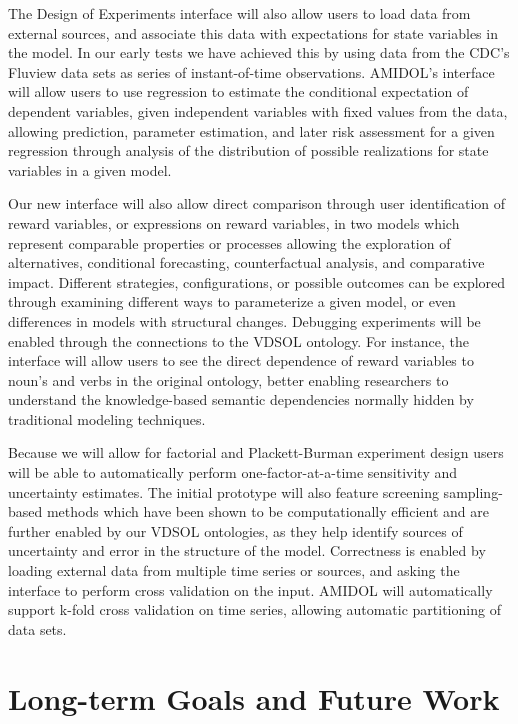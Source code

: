 \documentclass[11pt]{article}
\newcommand{\amidol}{\textsc{AMIDOL}}
\begin{document}
The Design of Experiments interface will also allow users to load data
from external sources, and associate this data with expectations for
state variables in the model.  In our early tests we have achieved
this by using data from the CDC's Fluview \cite{cdc2019fluview} data
sets as series of instant-of-time observations.  \amidol{}'s interface
will allow users to use regression to estimate the conditional
expectation of dependent variables, given independent variables with
fixed values from the data, allowing prediction, parameter estimation,
and later risk assessment for a given regression through analysis of
the distribution of possible realizations for state variables in a
given model.

Our new interface will also allow direct comparison through user
identification of reward variables, or expressions on reward
variables, in two models which represent comparable properties or
processes allowing the exploration of alternatives, conditional
forecasting, counterfactual analysis, and comparative impact.
Different strategies, configurations, or possible outcomes can be
explored through examining different ways to parameterize a given
model, or even differences in models with structural changes.
Debugging experiments will be enabled through the connections to the
VDSOL ontology.  For instance, the interface will allow users to see
the direct dependence of reward variables to noun's and verbs in the
original ontology, better enabling researchers to understand the
knowledge-based semantic dependencies normally hidden by traditional
modeling techniques.

Because we will allow for factorial and Plackett-Burman experiment
design users will be able to
automatically perform one-factor-at-a-time
\cite{bailis2005mortality,murphy2004quantification} sensitivity and
uncertainty estimates.  The initial prototype will also feature
screening sampling-based methods \cite{morris1991factorial} which have
been shown to be computationally efficient and are further enabled by
our VDSOL ontologies, as they help identify sources of uncertainty and
error in the structure of the model.  Correctness is enabled by
loading external data from multiple time series or sources, and asking
the interface to perform cross validation on the input.  \amidol{}
will automatically support k-fold cross validation on time series,
allowing automatic partitioning of data sets.

\section{Long-term Goals and Future Work}
\end{document}

